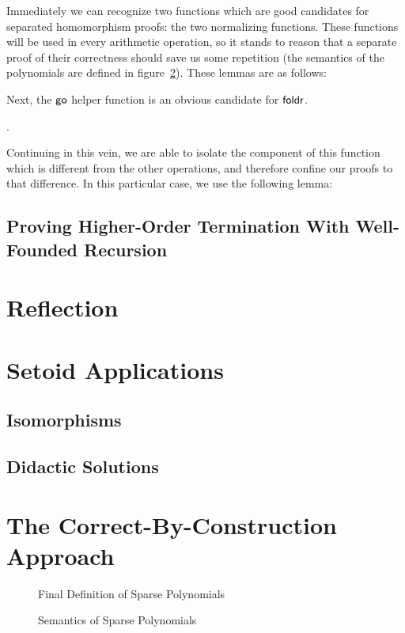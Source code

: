 \documentclass[draft, twocolumn]{article}
\theoremstyle{definition}
\theoremstyle{definition}
\begin{document}

Immediately we can recognize two functions which are good candidates for
separated homomorphism proofs: the two normalizing functions. These functions
will be used in every arithmetic operation, so it stands to reason that a
separate proof of their correctness should save us some repetition (the
semantics of the polynomials are defined in figure~\ref{semantics}). These
lemmas are as follows:


Next, the \(\AgdaFunction{go}\) helper function is an obvious candidate for
\(\AgdaFunction{foldr}\)\footnotemark.

.


Continuing in this vein, we are able to isolate the component of this function
which is different from the other operations, and therefore confine our proofs
to that difference. In this particular case, we use the following lemma:


\subsection{Proving Higher-Order Termination With Well-Founded Recursion}
\section{Reflection} \label{reflection}
\section{Setoid Applications}
\subsection{Isomorphisms}
\subsection{Didactic Solutions}
\section{The Correct-By-Construction Approach}


\appendix
\begin{figure}
  \caption{Final Definition of Sparse Polynomials}
  \label{final-poly-def}
\end{figure}
\begin{figure}
  \caption{Semantics of Sparse Polynomials}
  \label{semantics}
\end{figure}
\end{document}
